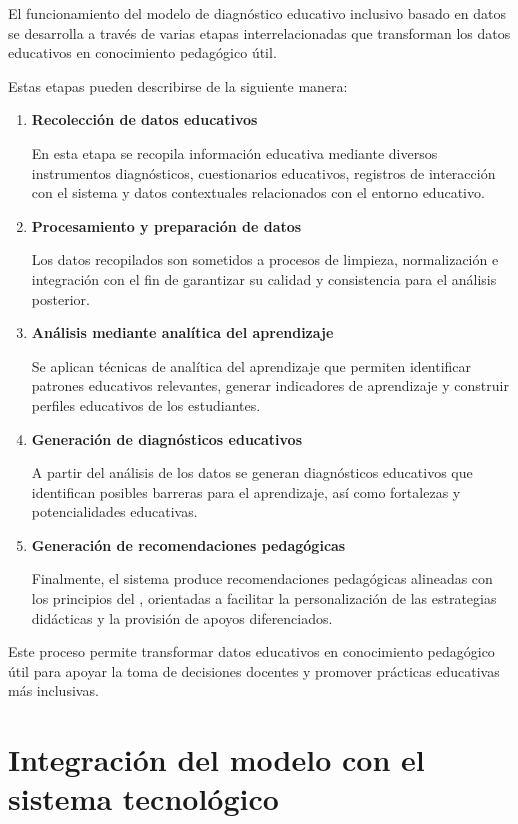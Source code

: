 \begin{refsection}
El funcionamiento del modelo de diagnóstico educativo inclusivo basado en datos se desarrolla a través de varias etapas interrelacionadas que transforman los datos educativos en conocimiento pedagógico útil.

Estas etapas pueden describirse de la siguiente manera:

\begin{enumerate}

\item \textbf{Recolección de datos educativos}

En esta etapa se recopila información educativa mediante diversos instrumentos diagnósticos, cuestionarios educativos, registros de interacción con el sistema y datos contextuales relacionados con el entorno educativo.

\item \textbf{Procesamiento y preparación de datos}

Los datos recopilados son sometidos a procesos de limpieza, normalización e integración con el fin de garantizar su calidad y consistencia para el análisis posterior.

\item \textbf{Análisis mediante analítica del aprendizaje}

Se aplican técnicas de analítica del aprendizaje que permiten identificar patrones educativos relevantes, generar indicadores de aprendizaje y construir perfiles educativos de los estudiantes.

\item \textbf{Generación de diagnósticos educativos}

A partir del análisis de los datos se generan diagnósticos educativos que identifican posibles barreras para el aprendizaje, así como fortalezas y potencialidades educativas.

\item \textbf{Generación de recomendaciones pedagógicas}

Finalmente, el sistema produce recomendaciones pedagógicas alineadas con los principios del \DUA, orientadas a facilitar la personalización de las estrategias didácticas y la provisión de apoyos diferenciados.

\end{enumerate}

Este proceso permite transformar datos educativos en conocimiento pedagógico útil para apoyar la toma de decisiones docentes y promover prácticas educativas más inclusivas.

\section{Integración del modelo con el sistema tecnológico}


\end{refsection}
